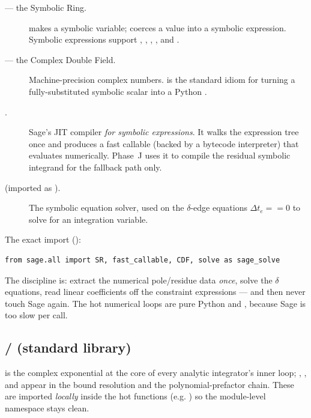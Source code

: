 \begin{description}
  \item[ --- the Symbolic Ring.]  makes a symbolic
        variable;  coerces a value into a symbolic expression.
        Symbolic expressions support , ,
        , , and .
  \item[ --- the Complex Double Field.] Machine-precision complex
        numbers.  is the standard idiom for turning a
        fully-substituted symbolic scalar into a Python .
  \item[.] Sage's JIT compiler
        \emph{for symbolic expressions}. It walks the expression tree once and
        produces a fast callable (backed by a bytecode interpreter) that evaluates
         numerically. Phase~J uses it to compile the residual symbolic
        integrand for the  fallback path only.
  \item[ (imported as ).] The symbolic equation
        solver, used on the $\delta$-edge equations $\Delta t_e == 0$ to solve for
        an integration variable.
\end{description}

\noindent The exact import ():

\begin{lstlisting}
from sage.all import SR, fast_callable, CDF, solve as sage_solve
\end{lstlisting}

The discipline is: extract the numerical pole/residue data \emph{once}, solve the
$\delta$ equations, read linear coefficients off the constraint expressions --- and
then never touch Sage again. The hot numerical loops are pure Python
 and , because Sage is too slow per call.

\subsection{ /  (standard library)}

 is the complex exponential at the core of every analytic
integrator's inner loop; , , and
 appear in the bound resolution and the polynomial-prefactor
chain. These are imported \emph{locally} inside the hot functions (e.g.
) so the module-level namespace stays clean.

